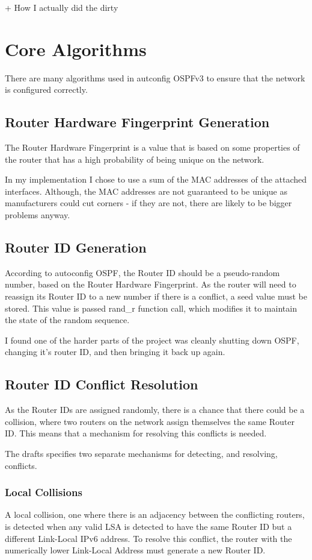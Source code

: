 \documentclass[12pt]{report}
\begin{document}
+ How I actually did the dirty

\section{Core Algorithms}
There are many algorithms used in autconfig OSPFv3 to ensure that the network
is configured correctly.

\subsection{Router Hardware Fingerprint Generation}
The Router Hardware Fingerprint is a value that is based on some properties of
the router that has a high probability of being unique on the network. 

In my implementation I chose to use a sum of the MAC  addresses of the attached interfaces.
Although, the MAC addresses are not guaranteed to be unique as manufacturers
could cut corners - if they are not, there are likely to be bigger problems
anyway.

\subsection{Router ID Generation}
According to autoconfig OSPF, the Router ID should be a pseudo-random number,
based on the Router Hardware Fingerprint. As the router will need to reassign
its Router ID to a new number if there is a conflict, a seed value must be
stored. This value is passed rand\_r function call, which modifies it to
maintain the state of the random sequence.

I found one of the harder parts of the project was cleanly shutting down OSPF,
changing it's router ID, and then bringing it back up again. 

\subsection{Router ID Conflict Resolution}
As the Router IDs are assigned randomly, there is a chance that there could be
a collision, where two routers on the network assign themselves the same Router
ID\@.  This means that a mechanism for resolving this conflicts is needed. 

The drafts specifies two separate mechanisms for detecting, and resolving,
conflicts. 

\subsubsection{Local Collisions}
A local collision, one where there is an adjacency between the conflicting
routers, is detected when any valid LSA is detected to have the same Router ID
but a different Link-Local IPv6 address. To resolve this conflict, the router
with the numerically lower Link-Local Address must generate a new Router ID\@. 
\end{document}
